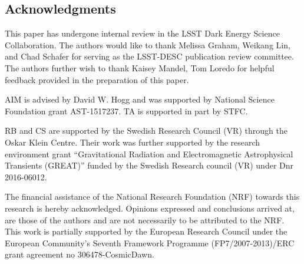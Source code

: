 \documentclass[\docopts]{\docclass}
\begin{document}














\subsection*{Acknowledgments}




This paper has undergone internal review in the LSST Dark Energy Science Collaboration. %
The authors would like to thank Melissa Graham, Weikang Lin, and Chad Schafer for serving as the LSST-DESC publication review committee.
The authors further wish to thank Kaisey Mandel, Tom Loredo for helpful feedback provided in the preparation of this paper.

AIM is advised by David W. Hogg and was supported by National Science Foundation grant AST-1517237.
TA is supported in part by STFC.

RB and CS are supported by the Swedish Research Council (VR) through the Oskar Klein Centre.
Their work was further supported by the research environment grant ``Gravitational Radiation and Electromagnetic Astrophysical Transients (GREAT)'' funded by the Swedish Research council (VR) under Dnr 2016-06012.

The financial assistance of the National Research Foundation (NRF) towards this research is hereby acknowledged.
Opinions expressed and conclusions arrived at, are those of the authors and are not necessarily to be attributed to the NRF.
This work is partially supported by the European Research Council under the European Community’s Seventh Framework Programme (FP7/2007-2013)/ERC grant agreement no 306478-CosmicDawn.
\end{document}
